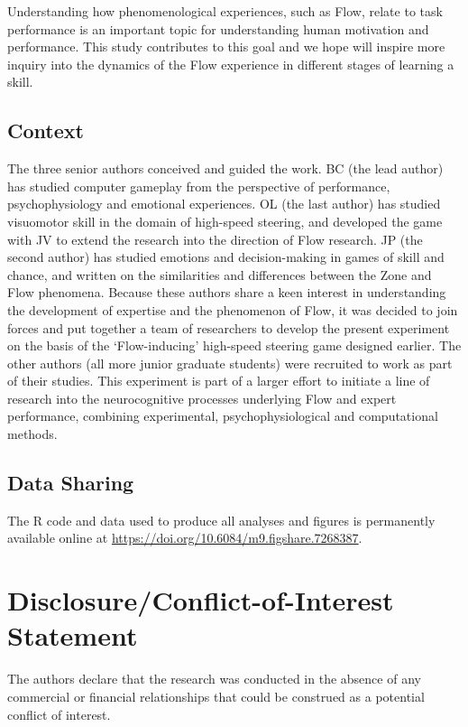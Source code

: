 \documentclass{frontierstyle/frontiersSCNS}
\begin{document}
Understanding how phenomenological experiences, such as Flow, relate to task performance is an important topic for understanding human motivation and performance. This study contributes to this goal and we hope will inspire more inquiry into the dynamics of the Flow experience in different stages of learning a skill.


\subsection{Context}
The three senior authors conceived and guided the work. BC (the lead author) has studied computer gameplay from the perspective of performance, psychophysiology and emotional experiences. OL (the last author) has studied visuomotor skill in the domain of high-speed steering, and developed the game with JV to extend the research into the direction of Flow research. JP (the second author) has studied emotions and decision-making in games of skill and chance, and written on the similarities and differences between the Zone and Flow phenomena. Because these authors share a keen interest in understanding the development of expertise and the phenomenon of Flow, it was decided to join forces and put together a team of researchers to develop the present experiment on the basis of the `Flow-inducing' high-speed steering game designed earlier. The other authors (all more junior graduate students) were recruited to work as part of their studies. This experiment is part of a larger effort to initiate a line of research into the neurocognitive processes underlying Flow and expert performance, combining experimental, psychophysiological and computational methods.


\subsection{Data Sharing}
The {\sf R} code and data used to produce all analyses and figures is permanently available online at \url{https://doi.org/10.6084/m9.figshare.7268387}.


\section*{Disclosure/Conflict-of-Interest Statement}
The authors declare that the research was conducted in the absence of any commercial or financial relationships that could be construed as a potential conflict of interest.
\end{document}
